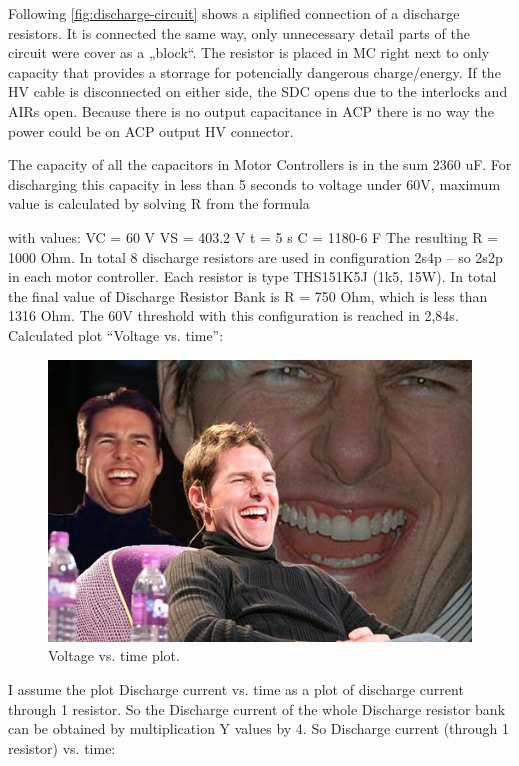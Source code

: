 Following \ref{fig:discharge-circuit} shows a siplified connection of a discharge resistors. It is connected the same way, only unnecessary detail parts of the circuit were cover as a „block“. The resistor is placed in MC right next to only capacity that provides a storrage for potencially dangerous charge/energy. If the HV cable is disconnected on either side, the SDC opens due to the interlocks and AIRs open. Because there is no output capacitance in ACP there is no way the power could be on ACP output HV connector.

The capacity of all the capacitors in Motor Controllers is in the sum 2360 uF. For discharging this capacity in less than 5 seconds to voltage under 60V, maximum value is calculated by solving R from the formula

with values:
VC = 60 V
VS = 403.2 V
t = 5 s
C = 1180-6 F
The resulting R = 1000 Ohm. In total 8 discharge resistors are used in configuration 2s4p – so 2s2p in each motor controller. Each resistor is type THS151K5J (1k5, 15W). In total the final value of Discharge Resistor Bank is R = 750 Ohm, which is less than 1316 Ohm. The 60V threshold with this configuration is reached in 2,84s. Calculated plot “Voltage vs. time”:

\begin{figure}[H]
	\centering
	\includegraphics[width=\textwidth]{./img/tsal-wiring.jpg}
	\caption{Voltage vs. time plot.}
	\label{fig:dis-voltagae-time}
\end{figure}

I assume the plot Discharge current vs. time as a plot of discharge current through 1 resistor. So the Discharge current of the whole Discharge resistor bank can be obtained by multiplication Y values by 4. So Discharge current (through 1 resistor) vs. time:

